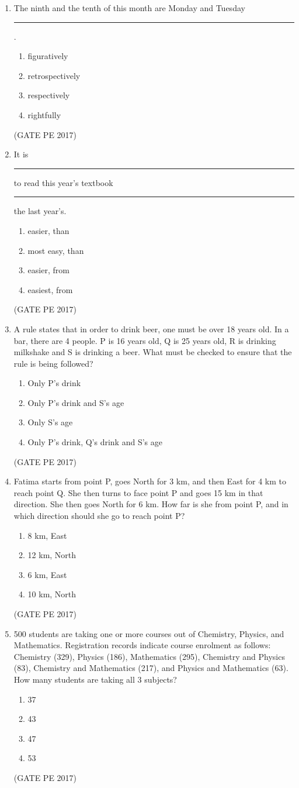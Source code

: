\documentclass[journal,12pt,onecolumn]{IEEEtran}
\theoremstyle{remark}
\begin{document}
\begin{enumerate}[start=1, label={Q\arabic*.}]
\item The ninth and the tenth of this month are Monday and Tuesday \rule{2cm}{0.4pt}.
\begin{enumerate}
\item figuratively
\item retrospectively
\item respectively
\item rightfully
\end{enumerate}
\hfill{(GATE PE 2017)}


\item It is \rule{2cm}{0.4pt} to read this year’s textbook \rule{2cm}{0.4pt} the last year’s.
\begin{enumerate}
\item easier, than
\item most easy, than
\item easier, from
\item easiest, from
\end{enumerate}
\hfill{(GATE PE 2017)}

\item A rule states that in order to drink beer, one must be over 18 years old. In a bar, there are 4 people. P is 16 years old, Q is 25 years old, R is drinking milkshake and S is drinking a beer. What must be checked to ensure that the rule is being followed?
\begin{enumerate}
\item Only P’s drink
\item Only P’s drink and S’s age
\item Only S’s age
\item Only P’s drink, Q’s drink and S’s age
\end{enumerate}
\hfill{(GATE PE 2017)}

\item Fatima starts from point P, goes North for 3 km, and then East for 4 km to reach point Q. She then turns to face point P and goes 15 km in that direction. She then goes North for 6 km. How far is she from point P, and in which direction should she go to reach point P?
\begin{enumerate}
\item 8 km, East
\item 12 km, North
\item 6 km, East
\item 10 km, North
\end{enumerate}
\hfill{(GATE PE 2017)}

\item 500 students are taking one or more courses out of Chemistry, Physics, and Mathematics. Registration records indicate course enrolment as follows: Chemistry (329), Physics (186), Mathematics (295), Chemistry and Physics (83), Chemistry and Mathematics (217), and Physics and Mathematics (63). How many students are taking all 3 subjects?
\begin{enumerate}
\item 37
\item 43
\item 47
\item 53
\end{enumerate}
\hfill{(GATE PE 2017)}



\end{enumerate}
\end{document}

